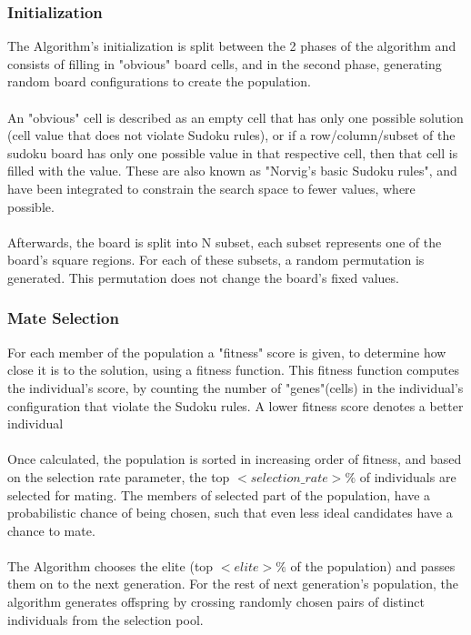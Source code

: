 \documentclass[12pt, a4paper]{article}
\begin{document}
			\subsubsection{Initialization}
			The Algorithm's initialization is split between the 2 phases of the algorithm and consists of filling in "obvious" board cells, and in the second phase, generating random board configurations to create the population.\\\\
			An "obvious" cell is described as an empty cell that has only one possible solution (cell value that does not violate Sudoku rules), or if a row/column/subset of the sudoku board has only one possible value in that respective cell, then that cell is filled with the value. These are also known as "Norvig's basic Sudoku rules", and have been integrated to constrain the search space to fewer values, where possible.\\\\
			Afterwards, the board is split into N subset, each subset represents one of the board's square regions. For each of these subsets, a random permutation is generated. This permutation does not change the board's fixed values.
			\subsubsection{Mate Selection}
			For each member of the population a "fitness" score is given, to determine how close it is to the solution, using a fitness function. This fitness function computes the individual's score, by counting the number of "genes"(cells) in the individual's configuration that violate the Sudoku rules. A lower fitness score denotes a better individual\\\\
			Once calculated, the population is sorted in increasing order of fitness, and based on the selection rate parameter, the top $<selection\_rate>\%$ of individuals are selected for mating. The members of selected part of the population, have a probabilistic chance of being chosen, such that even less ideal candidates have a chance to mate.\\\\
			The Algorithm chooses the elite (top $<elite>\%$ of the population) and passes them on to the next generation. For the rest of next generation's population, the algorithm generates offspring by crossing randomly chosen pairs of distinct individuals from the selection pool.
\end{document}
